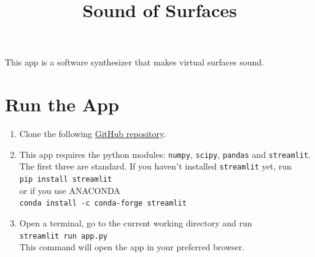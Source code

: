 \documentclass[12pt]{scrartcl}%
\title{Sound of Surfaces}
\date{\vspace{-4ex}}
\begin{document}
\maketitle
This app is a software synthesizer that makes virtual surfaces sound.
\section*{Run the App}
\begin{enumerate}
\item Clone the following \href{https://github.com/ChristophSeidel1234/Surface_Sound}{GitHub repository}.
\item This app requires the python modules: \texttt{numpy}, \texttt{scipy}, \texttt{pandas} and \texttt{streamlit}. The first three are standard. If you haven$'$t installed \texttt{streamlit} yet, run\\
\texttt{pip install streamlit}\\
or if you use ANACONDA\\
\texttt{conda install -c conda-forge streamlit}
\item Open a terminal, go to the current working directory and run\\
\texttt{streamlit run app.py}\\ This command will open the app in your preferred browser.
\end{enumerate}
\end{document}

